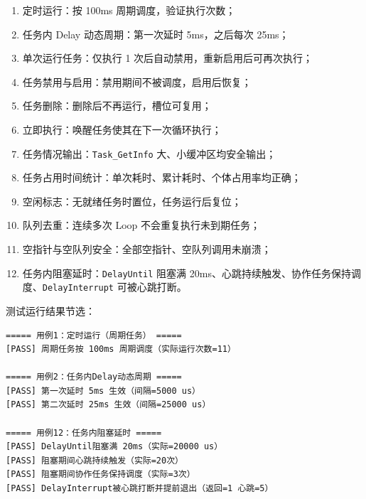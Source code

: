 \begin{enumerate}
\item 定时运行：按 100ms 周期调度，验证执行次数；
\item 任务内 Delay 动态周期：第一次延时 5ms，之后每次 25ms；
\item 单次运行任务：仅执行 1 次后自动禁用，重新启用后可再次执行；
\item 任务禁用与启用：禁用期间不被调度，启用后恢复；
\item 任务删除：删除后不再运行，槽位可复用；
\item 立即执行：唤醒任务使其在下一次循环执行；
\item 任务情况输出：\texttt{Task\_GetInfo} 大、小缓冲区均安全输出；
\item 任务占用时间统计：单次耗时、累计耗时、个体占用率均正确；
\item 空闲标志：无就绪任务时置位，任务运行后复位；
\item 队列去重：连续多次 Loop 不会重复执行未到期任务；
\item 空指针与空队列安全：全部空指针、空队列调用未崩溃；
\item 任务内阻塞延时：\texttt{DelayUntil} 阻塞满 20ms、心跳持续触发、协作任务保持调度、\texttt{DelayInterrupt} 可被心跳打断。
\end{enumerate}

测试运行结果节选：

\begin{lstlisting}[style=c]
===== 用例1：定时运行（周期任务） =====
[PASS] 周期任务按 100ms 周期调度（实际运行次数=11）

===== 用例2：任务内Delay动态周期 =====
[PASS] 第一次延时 5ms 生效（间隔=5000 us）
[PASS] 第二次延时 25ms 生效（间隔=25000 us）

===== 用例12：任务内阻塞延时 =====
[PASS] DelayUntil阻塞满 20ms（实际=20000 us）
[PASS] 阻塞期间心跳持续触发（实际=20次）
[PASS] 阻塞期间协作任务保持调度（实际=3次）
[PASS] DelayInterrupt被心跳打断并提前退出（返回=1 心跳=5）
\end{lstlisting}


